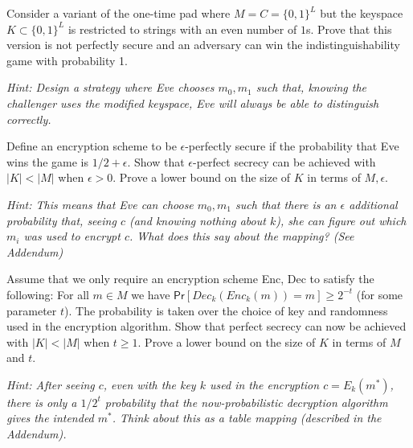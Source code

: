 \documentclass[10pt]{exam}
\begin{document}
\begin{questions}
\question[5] Consider a variant of the one-time pad where $M=C=\{0,1\}^L$ but the keyspace $K\subset \{0,1\}^L$ is restricted to strings with an even number of $1$s. Prove that this version is not perfectly secure and an adversary can win the indistinguishability game with probability 1.

\textit{Hint: Design a strategy where Eve chooses $m_0,m_1$ such that, knowing the challenger uses the modified keyspace, Eve will always be able to distinguish correctly.}

\question[5] Define an encryption scheme to be $\epsilon$-perfectly secure if the probability that Eve wins the game is $1/2+\epsilon$. Show that $\epsilon$-perfect secrecy can be achieved with $|K|<|M|$ when $\epsilon>0$. Prove a lower bound on the size of $K$ in terms of $M,\epsilon$.

\textit{Hint: This means that Eve can choose $m_0,m_1$ such that there is an $\epsilon$ additional probability that, seeing $c$ (and knowing nothing about $k$), she can figure out which $m_i$ was used to encrypt $c$. What does this say about the mapping? (See Addendum)}

\question[5] Assume that we only require an encryption scheme {\sf Enc, Dec} to satisfy the following: For all $m \in M$ we have $\mathsf{Pr}[Dec_k(Enc_k(m))=m] \geq 2^{-t}$ (for some parameter $t$). The probability is taken over the choice of key and randomness used in the encryption algorithm. Show that perfect secrecy can now be achieved with $|K| < |M|$ when $t\geq 1$. Prove a lower bound on the size of $K$ in terms of $M$ and $t$. 

\textit{Hint: After seeing $c$, even with the key $k$ used in the encryption $c=E_k(m^*)$, there is only a $1/2^t$ probability that the now-probabilistic decryption algorithm gives the intended $m^*$. Think about this as a table mapping (described in the Addendum).}

\bigskip 

    \noindent{}
\end{questions}
\end{document}
